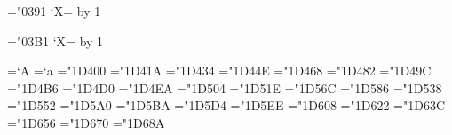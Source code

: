\newcount\umathnumA  \newcount\umathnumB

\def\umathcorr#1#2{\expandafter#1\expandafter{\the#2}}
\def\umathprepare#1{\def\umathscanholes##1[#1]##2##3\relax{##2}}
\def\umathvalue#1{\expandafter\umathscanholes\umathcharholes[#1]{#1}\relax}

\def\umathcharholes{%
   [119893]{"210E}[119965]{"212C}[119968]{"2130}[119969]{"2131}%
   [119971]{"210B}[119972]{"2110}[119975]{"2112}[119976]{"2133}[119981]{"211B}%
   [119994]{"212F}[119996]{"210A}[120004]{"2134}%
   [120070]{"212D}[120075]{"210C}[120076]{"2111}[120085]{"211C}[120093]{"2128}%
   [120122]{"2102}[120127]{"210D}[120133]{"2115}[120135]{"2119}
   [120136]{"211A}[120137]{"211D}[120145]{"2124}%
}
\def\umathrange#1#2{\umathnumB=#2\relax \umathrangeA#1}
\def\umathrangeA#1-#2{\umathnumA=`#1\relax
   \loop
      \umathcorr\umathprepare\umathnumB
      \Umathcode \umathnumA = 7 1 \umathcorr\umathvalue{\umathnumB}
      \ifnum\umathnumA<`#2\relax
         \advance\umathnumA by1 \advance\umathnumB by1
   \repeat
}
\def\umathrangeGREEK{\begingroup
   \lccode`A="0391 \lccode`Z="03A9
   \lowercase{\endgroup\umathrange{A-Z}}}
\def\umathrangegreek{\begingroup
   \lccode`A="03B1 \lccode`Z="03D6
   \lowercase{\endgroup\umathrange{A-Z}}}
\def\greekdef#1{\ifx#1\relax \else
   \begingroup \lccode`X=\umathnumB \lowercase{\endgroup \def#1{X}}%
   \advance\umathnumB by 1
   \expandafter\greekdef \fi
}
\umathnumB="0391
\greekdef \Alpha \Beta \Gamma \Delta \Epsilon \Zeta \Eta \Theta \Iota \Kappa
   \Lambda \Mu \Nu \Xi \Omicron \Pi \Rho \varTheta \Sigma \Tau \Upsilon \Phi
   \Chi \Psi \Omega \relax

\umathnumB="03B1
\greekdef \alpha \beta \gamma \delta \epsilon \zeta \eta \theta \iota \kappa
   \lambda \mu \nu \xi \omicron \pi \rho \varsigma \sigma \tau \upsilon
   \varphi \chi \psi \omega \varbeta \vartheta \phi \varpi \relax

\chardef\ncharrmA=`A       \chardef\ncharrma=`a
\chardef\ncharbfA="1D400   \chardef\ncharbfa="1D41A
\chardef\ncharitA="1D434   \chardef\ncharita="1D44E
\chardef\ncharbiA="1D468   \chardef\ncharbia="1D482
\chardef\ncharclA="1D49C   \chardef\ncharcla="1D4B6
\chardef\ncharbcA="1D4D0   \chardef\ncharbca="1D4EA
\chardef\ncharfrA="1D504   \chardef\ncharfra="1D51E
\chardef\ncharbrA="1D56C   \chardef\ncharbra="1D586
\chardef\ncharbbA="1D538   \chardef\ncharbba="1D552
\chardef\ncharsnA="1D5A0   \chardef\ncharsna="1D5BA
\chardef\ncharbsA="1D5D4   \chardef\ncharbsa="1D5EE
\chardef\ncharsiA="1D608   \chardef\ncharsia="1D622
\chardef\ncharsxA="1D63C   \chardef\ncharbsx="1D656
\chardef\ncharttA="1D670   \chardef\nchartta="1D68A

